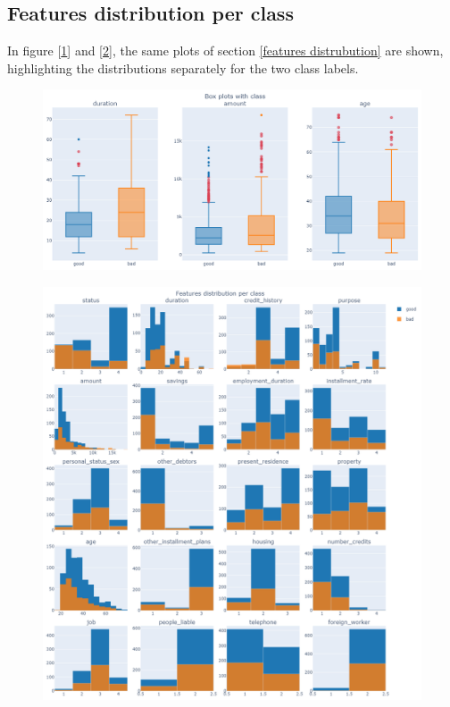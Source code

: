 \documentclass[letterpaper]{article}
\begin{document}
	\subsection{Features distribution per class}
	In figure [\ref{fig:4}] and [\ref{fig:5}], the same plots of section \ref{features distrubution} are shown, highlighting the distributions separately for the two class labels. 
	\begin{figure}[h]
		\centering
		\includegraphics[width=.85\textwidth]{images/boxplots_with_classes.png}
		\label{fig:4}
	\end{figure}
	\begin{figure}[h]
		\centering
		\includegraphics[width=.8\textwidth]{images/distributions_by_class.png}
		\label{fig:5}
	\end{figure}
	
\end{document}
